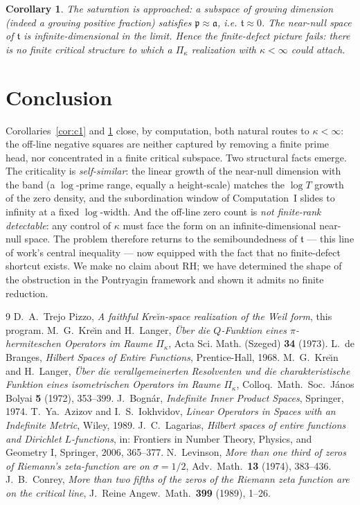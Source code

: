\documentclass[11pt]{amsart}
\newtheorem{corollary}[theorem]{Corollary}
\theoremstyle{definition}
\theoremstyle{remark}
\newcommand{\fa}{\mathfrak a}
\newcommand{\fp}{\mathfrak p}
\newcommand{\ft}{\mathfrak t}
\begin{document}
\begin{corollary}\label{cor:c2}
The saturation is \emph{approached}: a subspace of growing dimension (indeed a
growing positive fraction) satisfies $\fp\approx\fa$, i.e. $\ft\approx0$. The
near-null space of $\ft$ is infinite-dimensional in the limit. Hence the
finite-defect picture fails: there is no finite critical structure to which a
$\Pi_\kappa$ realization with $\kappa<\infty$ could attach.
\end{corollary}

\section{Conclusion}
Corollaries~\ref{cor:c1} and \ref{cor:c2} close, by computation, both natural
routes to $\kappa<\infty$: the off-line negative squares are neither captured by
removing a finite prime head, nor concentrated in a finite critical subspace.
Two structural facts emerge. The criticality is \emph{self-similar}: the linear
growth of the near-null dimension with the band (a $\log$-prime range, equally a
height-scale) matches the $\log T$ growth of the zero density, and the
subordination window of Computation~I slides to infinity at a fixed $\log$-width.
And the off-line zero count is \emph{not finite-rank detectable}: any control of
$\kappa$ must face the form on an infinite-dimensional near-null space. The
problem therefore returns to the semiboundedness of $\ft$ --- this line of work's
central inequality --- now equipped with the fact that no finite-defect
shortcut exists. We make no claim about RH; we have determined the shape of the
obstruction in the Pontryagin framework and shown it admits no finite reduction.

\begin{thebibliography}{9}
 D.~A.~Trejo Pizzo, \emph{A faithful Kre\u\i n-space realization of
the Weil form}, this program.
 M.~G.~Kre\u\i n and H.~Langer, \emph{\"Uber die
$Q$-Funktion eines $\pi$-hermiteschen Operators im Raume $\Pi_\kappa$}, Acta
Sci. Math. (Szeged) \textbf{34} (1973).
 L.~de Branges, \emph{Hilbert Spaces of Entire Functions}, Prentice-Hall, 1968.
 M.~G.~Kre\u\i n and H.~Langer, \emph{\"Uber die verallgemeinerten Resolventen und die charakteristische Funktion eines isometrischen Operators im Raume $\Pi_\kappa$}, Colloq.\ Math.\ Soc.\ J\'anos Bolyai \textbf{5} (1972), 353--399.
 J.~Bogn\'ar, \emph{Indefinite Inner Product Spaces}, Springer, 1974.
 T.~Ya.~Azizov and I.~S.~Iokhvidov, \emph{Linear Operators in Spaces with an Indefinite Metric}, Wiley, 1989.
 J.~C.~Lagarias, \emph{Hilbert spaces of entire functions and Dirichlet $L$-functions}, in: Frontiers in Number Theory, Physics, and Geometry I, Springer, 2006, 365--377.
 N.~Levinson, \emph{More than one third of zeros of Riemann's zeta-function are on $\sigma=1/2$}, Adv.\ Math.\ \textbf{13} (1974), 383--436.
 J.~B.~Conrey, \emph{More than two fifths of the zeros of the Riemann zeta function are on the critical line}, J.\ Reine Angew.\ Math.\ \textbf{399} (1989), 1--26.
\end{thebibliography}
\end{document}
